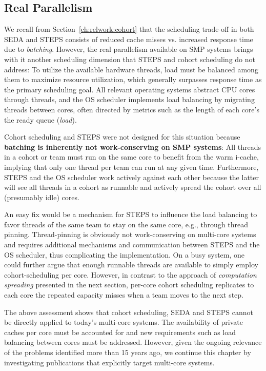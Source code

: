 \documentclass[12pt,a4paper]{book}
\begin{document}
\subsection{Real Parallelism}
We recall from Section~\ref{ch:relwork:cohort} that the scheduling trade-off in both SEDA and STEPS consists of reduced cache misses vs. increased response time due to \emph{batching}.
However, the real parallelism available on SMP systems brings with it another scheduling dimension that STEPS and cohort scheduling do not address:
To utilize the available hardware threads, load must be balanced among them to maximize resource utilization, which generally surpasses response time as the primary scheduling goal.
All relevant operating systems abstract CPU cores through threads, and the OS scheduler implements load balancing by migrating threads between cores, often directed by metrics such as the length of each core's the ready queue (\emph{load}).~\cite{freeBSDSchedulerLoad}

Cohort scheduling and STEPS were not designed for this situation because
\textbf{batching is inherently not work-conserving on SMP systems}:
All threads in a cohort or team must run on the same core to benefit from the warm i-cache, implying that only one thread per team can run at any given time.
Furthermore, STEPS and the OS scheduler work actively against each other because the latter will see all threads in a cohort as runnable and actively spread the cohort over all (presumably idle) cores.

An easy fix would be a mechanism for STEPS to influence the load balancing to favor threads of the same team to stay on the same core, e.g., through thread pinning.
Thread-pinning is obviously not work-conserving on multi-core systems and requires additional mechanisms and communication between STEPS and the OS scheduler, thus complicating the implementation.
On a busy system, one could further argue that enough runnable threads are available to simply employ cohort-scheduling per core.
However, in contrast to the approach of \emph{computation spreading} presented in the next section, per-core cohort scheduling replicates to each core the repeated capacity misses when a team moves to the next step.

The above assessment shows that cohort scheduling, SEDA and STEPS cannot be directly applied to today's multi-core systems.
The availability of private caches per core must be accounted for and new requirements such as load balancing between cores must be addressed.
However, given the ongoing relevance of the problems identified more than 15 years ago, we continue this chapter by investigating publications that explicitly target multi-core systems.
\end{document}
